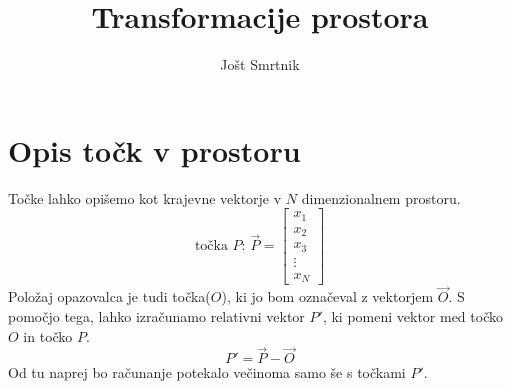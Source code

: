 \documentclass[a4paper, 11pt]{article}
\title{Transformacije prostora}
\author{Jošt Smrtnik}
\begin{document}
    \maketitle
    \section{Opis točk v prostoru}
    Točke lahko opišemo kot krajevne vektorje v $N$ dimenzionalnem prostoru.
    \begin{equation}
        \text{točka $P$: }\vec{P} = \left[
        \begin{matrix}
            x_1\\x_2\\x_3\\ \vdots \\ x_N
        \end{matrix}
        \right]
    \end{equation}
    Položaj opazovalca je tudi točka($O$), ki jo bom označeval z vektorjem $\vec{O}$. S pomočjo tega, lahko izračunamo relativni vektor $P'$, ki pomeni vektor med točko $O$ in točko $P$.
    \begin{equation}
        P' = \vec{P} - \vec{O}
    \end{equation}
    Od tu naprej bo računanje potekalo večinoma samo še s točkami $P'$.
\end{document}
